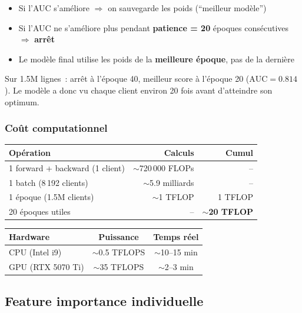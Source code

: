 \documentclass[12pt,a4paper]{article}
\begin{document}
\begin{itemize}[noitemsep]
    \item Si l'AUC s'am\'eliore $\Rightarrow$ on sauvegarde les poids (``meilleur mod\`ele'')
    \item Si l'AUC ne s'am\'eliore plus pendant \textbf{patience = 20} \'epoques cons\'ecutives $\Rightarrow$ \textbf{arr\^et}
    \item Le mod\`ele final utilise les poids de la \textbf{meilleure \'epoque}, pas de la derni\`ere
\end{itemize}

\begin{interpretbox}
Sur 1.5M lignes~: arr\^et \`a l'\'epoque 40, meilleur score \`a l'\'epoque 20 ($\text{AUC} = 0.814$). Le mod\`ele a donc vu chaque client environ 20 fois avant d'atteindre son optimum.
\end{interpretbox}

\subsubsection{Co\^ut computationnel}

\begin{center}
\begin{tabular}{lrr}
\toprule
\textbf{Op\'eration} & \textbf{Calculs} & \textbf{Cumul} \\
\midrule
1 forward + backward (1 client) & $\sim$720\,000 FLOPs & -- \\
1 batch (8\,192 clients) & $\sim$5.9 milliards & -- \\
1 \'epoque (1.5M clients) & $\sim$1 TFLOP & 1 TFLOP \\
20 \'epoques utiles & -- & \textbf{$\sim$20 TFLOP} \\
\bottomrule
\end{tabular}
\end{center}

\begin{center}
\begin{tabular}{lcc}
\toprule
\textbf{Hardware} & \textbf{Puissance} & \textbf{Temps r\'eel} \\
\midrule
CPU (Intel i9) & $\sim$0.5 TFLOPS & $\sim$10--15 min \\
GPU (RTX 5070 Ti) & $\sim$35 TFLOPS & $\sim$2--3 min \\
\bottomrule
\end{tabular}
\end{center}

\subsection{Feature importance individuelle}
\end{document}

